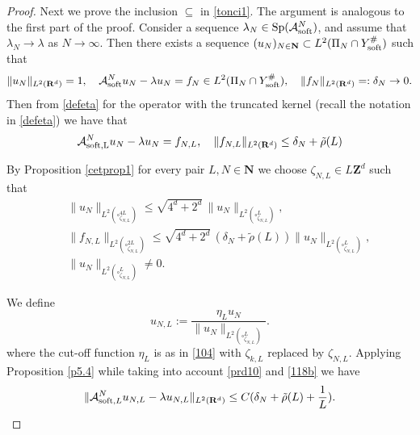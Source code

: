\documentclass[11pt]{article}
\newcommand\soft{{\rm soft}}
\def\RR{\R}
\newcommand{\R}{\mathbf{R}}
\def\AA{\mathcal{A}}
\DeclareMathOperator{\Sp}{Sp}
\theoremstyle{remark}
\begin{document}
\begin{proof}
	
	Next  we prove the inclusion $\subseteq$ in \eqref{tonci1}. The argument is analogous to the first part of the proof.
	Consider a sequence $\lambda_N \in \Sp (\AA_\soft^N)$, and assume that $\lambda_N \to \lambda$ as $N \to \infty$. Then there exists a  sequence
	$(u_N)_{N \in \mathbf{N}} \subset L^2(\Pi_N \cap Y_\soft^{\#})$ such that
	\begin{equation*}%
		\|u_N\|_{L^2(\RR^d)}=1, \quad \AA_\soft^{N} u_N-\lambda u_N=f_N \in L^2(\Pi_N \cap Y_\soft^{\#}),\quad  \|f_N\|_{L^2(\RR^d)}=:\delta_N \to 0. 	
	\end{equation*}
Then from \eqref{defeta} for the operator with the truncated kernel (recall the notation in \eqref{defeta}) we have that
		\begin{equation*}
		\AA_{\rm soft,L}^{N} u_N-\lambda u_N=f_{N,L}, \quad \|f_{N,L}\|_{L^2(\RR^d)} \leq \delta_N +\tilde{\rho}(L)
	\end{equation*}

	By Proposition \ref{cetprop1} for every pair $L,N \in \mathbf{N}$    we choose $\zeta_{N,L} \in L\mathbf{Z}^d$ such that
	\begin{eqnarray}\label{prd10}
		& &\|  u_N\|_{L^2(\square^{4L}_{\zeta_{N,L}})} \leq \sqrt{4^d+  2^d}\, \|  u_N\|_{L^2(\square^{ L}_{\zeta_{N,L}})},
		 \\
		 & &   \| f_{N,L}\|_{L^2(\square^{2L}_{\zeta_{N,L}})} \leq \sqrt{4^d+  2^d}\, (\delta_N +\tilde{\rho}(L))\| u_N\|_{L^2(\square^{L}_{\zeta_{N,L}})}, \label{118b}
		 \\ & &
           \|  u_N\|_{L^2(\square^{L}_{\zeta_{N,L}})} \neq 0.\nonumber
	\end{eqnarray}
	
	We define
	\begin{equation*} %
		u_{N,L} := \frac{\eta_L u_N}{\|u_N\|_{L^2(\square^L_{\zeta_{N,L} })}}.
	\end{equation*}	
	 where the cut-off function  $\eta_L $ is as in \eqref{104} with $\zeta_{k,L}$ replaced by $\zeta_{N,L}$. Applying Proposition \ref{p5.4} while taking into account \eqref{prd10} and \eqref{118b} we have
		\begin{equation} \label{utoest53}
		\| \AA_{\soft,L}^{N} u_{N,L}-\lambda u_{N,L}\|_{L^2(\RR^d)} \leq C (\delta_N +\tilde{\rho}(L) + \frac{1}{L}).
	\end{equation} 	
	

\end{proof}
\end{document}
